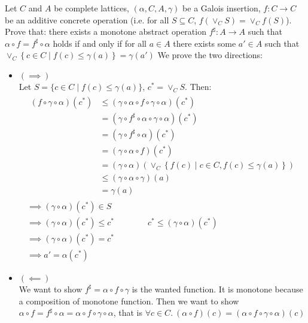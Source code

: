 \begin{exercise}{
    Let $C$ and $A$ be complete lattices, $(\alpha, C, A, \gamma)$ be a Galois insertion, $f: C \to C$ be an additive concrete operation (i.e. for all $S \subseteq C$, $f(\vee_C S) = \vee_C f(S)$). Prove that: there exists a monotone abstract operation $f^\sharp: A \to A$ such that $\alpha \circ f = f^\sharp \circ \alpha$ holds if and only if for all $a \in A$ there exists some $a' \in A$ such that $\vee_C \left\{ c \in C \mid f(c) \leq \gamma(a) \right\} = \gamma(a')$
}
    We prove the two directions:
    \begin{itemize}
        \item $(\implies)$ \\
        Let $S = \{c \in C \mid f(c) \leq \gamma(a)\}$, $c^* = \vee_C S$. Then:
        \begin{gather*}
            \begin{aligned}
                (f \circ \gamma \circ \alpha) (c^*)
                &\leq (\gamma \circ \alpha \circ f \circ \gamma \circ \alpha) (c^*) \\
                &= (\gamma \circ f^\sharp \circ \alpha \circ \gamma \circ \alpha) (c^*) \\
                &= (\gamma \circ f^\sharp \circ \alpha) (c^*) \\
                &= (\gamma \circ \alpha \circ f) (c^*) \\
                &= (\gamma \circ \alpha) (\vee_C \left\{f(c) \mid c \in C, f(c) \leq \gamma(a)\right\}) \\
                &\leq (\gamma \circ \alpha \circ \gamma) (a) \\
                &= \gamma (a)
            \end{aligned} \\
            \implies (\gamma \circ \alpha) (c^*) \in S \\
            \implies (\gamma \circ \alpha) (c^*) \leq c^* \qquad\qquad c^* \leq (\gamma \circ \alpha) (c^*) \\
            \implies (\gamma \circ \alpha) (c^*) = c^* \\
            \implies a' = \alpha(c^*)
        \end{gather*}
        \item $(\impliedby)$ \\
        We want to show $f^\sharp = \alpha \circ f \circ \gamma$ is the wanted function. It is monotone because a composition of monotone function. Then we want to show $\alpha \circ f = f^\sharp \circ \alpha = \alpha \circ f \circ \gamma \circ \alpha$, that is $\forall c \in C.\ (\alpha \circ f)(c) = (\alpha \circ f \circ \gamma \circ \alpha)(c)$ \\

\end{itemize}
\end{exercise}
